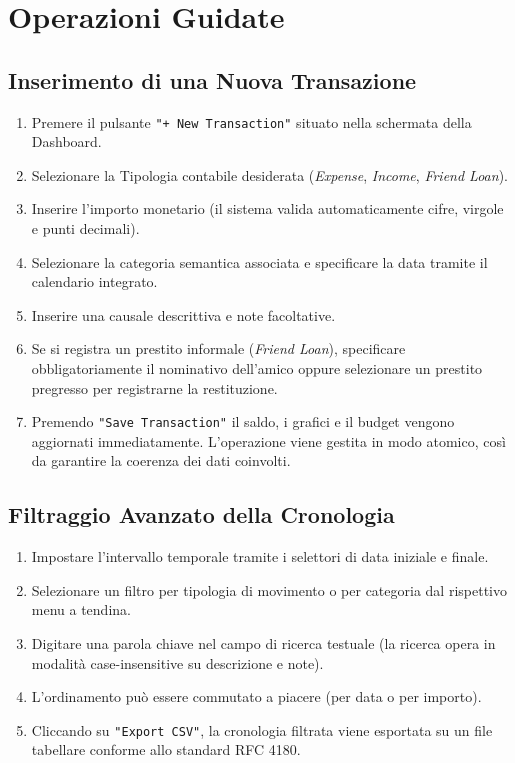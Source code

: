 \documentclass[11pt,a4paper,openright]{report}
\begin{document}
\section*{Operazioni Guidate}

\subsection*{Inserimento di una Nuova Transazione}
\begin{enumerate}
  \item Premere il pulsante \texttt{"+ New Transaction"} situato nella schermata della Dashboard.
  \item Selezionare la Tipologia contabile desiderata (\emph{Expense}, \emph{Income}, \emph{Friend Loan}).
  \item Inserire l'importo monetario (il sistema valida automaticamente cifre, virgole e punti decimali).
  \item Selezionare la categoria semantica associata e specificare la data tramite il calendario integrato.
  \item Inserire una causale descrittiva e note facoltative.
  \item Se si registra un prestito informale (\emph{Friend Loan}), specificare obbligatoriamente il nominativo dell'amico oppure selezionare un prestito pregresso per registrarne la restituzione.
  \item Premendo \texttt{"Save Transaction"} il saldo, i grafici e il budget vengono aggiornati immediatamente. L'operazione viene gestita in modo atomico, così da garantire la coerenza dei dati coinvolti.
\end{enumerate}

\subsection*{Filtraggio Avanzato della Cronologia}
\begin{enumerate}
  \item Impostare l'intervallo temporale tramite i selettori di data iniziale e finale.
  \item Selezionare un filtro per tipologia di movimento o per categoria dal rispettivo menu a tendina.
  \item Digitare una parola chiave nel campo di ricerca testuale (la ricerca opera in modalità case-insensitive su descrizione e note).
  \item L'ordinamento può essere commutato a piacere (per data o per importo).
  \item Cliccando su \texttt{"Export CSV"}, la cronologia filtrata viene esportata su un file tabellare conforme allo standard RFC 4180.
\end{enumerate}
\end{document}
